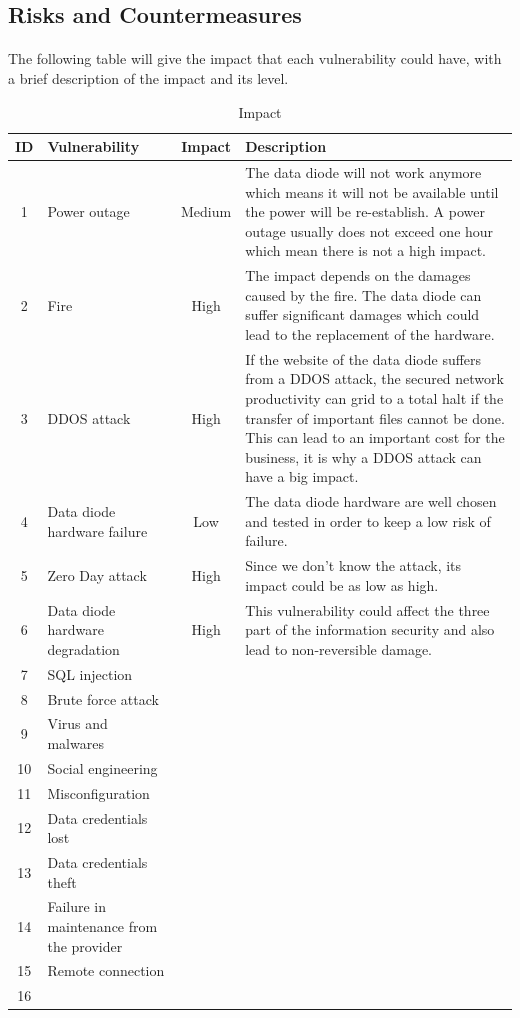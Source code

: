 \documentclass[a4paper,10pt]{article}
\begin{document}
\subsection{Risks and Countermeasures}

\paragraph{} The following table will give the impact that each vulnerability could have, with a brief description of the impact and its level.

\begin{table}[!h]
	\centering
	\begin{tabular}{|c|p{2.5cm}|c|p{10cm}|}
		\hline
		\textbf{ID}& \textbf{Vulnerability} &\textbf{Impact} & \textbf{Description}                 \\
		\hline
		1 & Power outage & Medium  &  The data diode will not work anymore which means it will not be available until the power will be re-establish. A power outage usually does not exceed one hour which mean there is not a high impact. \\
		\hline
		2 & Fire & High  &  The impact depends on the damages caused by the fire. The data diode can suffer significant damages which could lead to the replacement of the hardware.\\
		\hline
		3 & DDOS attack & High & If the website of the data diode suffers from a DDOS attack, the secured network productivity can grid to a total halt if the transfer of important files cannot be done. This can lead to an important cost for the business, it is why a DDOS attack can have a big impact.\\
		\hline
		4 & Data diode hardware failure  & Low & The data diode hardware are well chosen and tested in order to keep a low risk of failure.\\ 
		\hline
		5 & Zero Day attack & High & Since we don't know the attack, its impact could be as low as high.\\
		\hline
		6 & Data diode hardware degradation & High & This vulnerability could affect the three part of the information security and also lead to non-reversible damage. \\
		\hline
		7 &  SQL injection & & \\
		\hline
		8 & Brute force attack & & \\
		\hline
		9 & Virus and malwares & & \\
		\hline
		10 & Social engineering  & & \\
		\hline
		11 & Misconfiguration & & \\
		\hline
		12 & Data credentials lost & & \\
		\hline
		13 & Data credentials theft & & \\
		\hline
		14 & Failure in maintenance from the provider & & \\
		\hline
		15 & Remote connection & & \\
		\hline
		16 & & & \\
		\hline
	\end{tabular}
	\caption{Impact}
\end{table}
\end{document}
